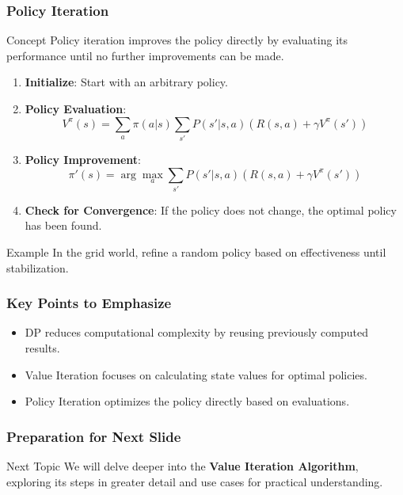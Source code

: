 \documentclass[aspectratio=169]{beamer}
\begin{document}
\begin{frame}[fragile]
    \frametitle{Policy Iteration}
    \begin{block}{Concept}
        Policy iteration improves the policy directly by evaluating its performance until no further improvements can be made.
    \end{block}
    
    \begin{enumerate}
        \item \textbf{Initialize}: Start with an arbitrary policy.
        \item \textbf{Policy Evaluation}:
            \begin{equation}
            V^\pi(s) = \sum_a \pi(a|s) \sum_{s'} P(s'|s, a) \left( R(s, a) + \gamma V^\pi(s') \right)
            \end{equation}
        \item \textbf{Policy Improvement}:
            \begin{equation}
            \pi'(s) = \arg\max_a \sum_{s'} P(s'|s, a) \left( R(s, a) + \gamma V^\pi(s') \right)
            \end{equation}
        \item \textbf{Check for Convergence}: If the policy does not change, the optimal policy has been found.
    \end{enumerate}

    \begin{block}{Example}
        In the grid world, refine a random policy based on effectiveness until stabilization.
    \end{block}
\end{frame}

\begin{frame}[fragile]
    \frametitle{Key Points to Emphasize}
    \begin{itemize}
        \item DP reduces computational complexity by reusing previously computed results.
        \item Value Iteration focuses on calculating state values for optimal policies.
        \item Policy Iteration optimizes the policy directly based on evaluations.
    \end{itemize}
\end{frame}

\begin{frame}[fragile]
    \frametitle{Preparation for Next Slide}
    \begin{block}{Next Topic}
        We will delve deeper into the \textbf{Value Iteration Algorithm}, exploring its steps in greater detail and use cases for practical understanding.
    \end{block}
\end{frame}
\end{document}
